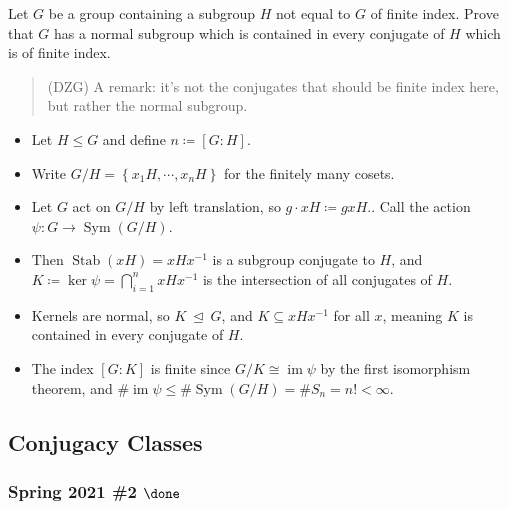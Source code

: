 Let \(G\) be a group containing a subgroup \(H\) not equal to \(G\) of
finite index. Prove that \(G\) has a normal subgroup which is contained
in every conjugate of \(H\) which is of finite index.

\begin{quote}
(DZG) A remark: it's not the conjugates that should be finite index
here, but rather the normal subgroup.
\end{quote}

\begin{solution}

\envlist

\begin{itemize}
\tightlist
\item
  Let \(H\leq G\) and define \(n\coloneqq[G:H]\).
\item
  Write \(G/H = \left\{{ x_1 H, \cdots, x_n H }\right\}\) for the
  finitely many cosets.
\item
  Let \(G\) act on \(G/H\) by left translation, so
  \(g\cdot xH \coloneqq gxH\).. Call the action
  \(\psi: G\to \operatorname{Sym}(G/H)\).
\item
  Then \({\operatorname{Stab}}(xH) = xHx^{-1}\) is a subgroup conjugate
  to \(H\), and
  \(K\coloneqq\ker \psi = \displaystyle\bigcap_{i=1}^n xHx^{-1}\) is the
  intersection of all conjugates of \(H\).
\item
  Kernels are normal, so \(K{~\trianglelefteq~}G\), and
  \(K\subseteq xHx^{-1}\) for all \(x\), meaning \(K\) is contained in
  every conjugate of \(H\).
\item
  The index \([G:K]\) is finite since
  \(G/K \cong \operatorname{im}\psi\) by the first isomorphism theorem,
  and
  \(\# \operatorname{im}\psi \leq \# \operatorname{Sym}(G/H) = \# S_n = n! < \infty\).
\end{itemize}

\end{solution}

\hypertarget{conjugacy-classes}{%
\subsection{Conjugacy Classes}\label{conjugacy-classes}}

\hypertarget{spring-2021-2-done}{%
\subsubsection{\texorpdfstring{Spring 2021 \#2
\(\done\)}{Spring 2021 \#2 \textbackslash done}}\label{spring-2021-2-done}}

